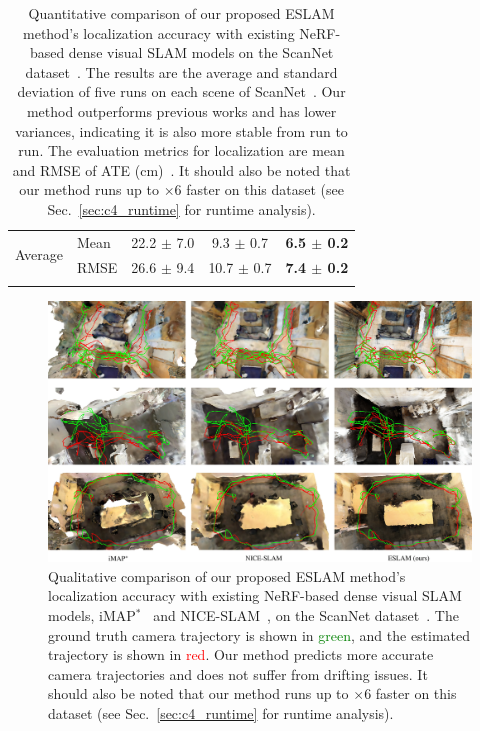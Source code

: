 \begin{table}[t]
\begin{center}
\begin{tabular}{ll|ccc}
            \hline
            \multirow{2}{*}{Average} & Mean & 22.2 $\pm$ \phantom{0}7.0 & \phantom{0}9.3 $\pm$ 0.7 & \textbf{6.5 $\pm$ 0.2} \\
            & RMSE & 26.6 $\pm$ \phantom{0}9.4 & 10.7 $\pm$ 0.7 & \textbf{7.4 $\pm$ 0.2} \\

            \Xhline{2\arrayrulewidth}
        \end{tabular}
    \end{center}
    \caption{Quantitative comparison of our proposed ESLAM method's localization accuracy with existing NeRF-based dense visual SLAM models on the ScanNet dataset~\cite{dai2017scannet}. The results are the average and standard deviation of five runs on each scene of ScanNet~\cite{dai2017scannet}. Our method outperforms previous works and has lower variances, indicating it is also more stable from run to run. The evaluation metrics for localization are mean and RMSE of ATE (cm)~\cite{sturm2012benchmark}. It should also be noted that our method runs up to $\times$6 faster on this dataset (see Sec.~\ref{sec:c4_runtime} for runtime analysis).}
    \label{table:quantitative_scannet}
\end{table}

\begin{figure}[t]
    \begin{center}
        \includegraphics[width=1.0\linewidth]{images/chapter4/figures/Fig4.jpg}
    \end{center}
    \caption{Qualitative comparison of our proposed ESLAM method's localization accuracy with existing NeRF-based dense visual SLAM models, iMAP$^*$~\cite{sucar2021imap} and NICE-SLAM~\cite{zhu2022nice}, on the ScanNet dataset~\cite{dai2017scannet}. The ground truth camera trajectory is shown in \textcolor{green}{green}, and the estimated trajectory is shown in \textcolor{red}{red}. Our method predicts more accurate camera trajectories and does not suffer from drifting issues. It should also be noted that our method runs up to $\times$6 faster on this dataset (see Sec.~\ref{sec:c4_runtime} for runtime analysis).}
    \label{fig:c4_qualitative_tracking}
\end{figure}

